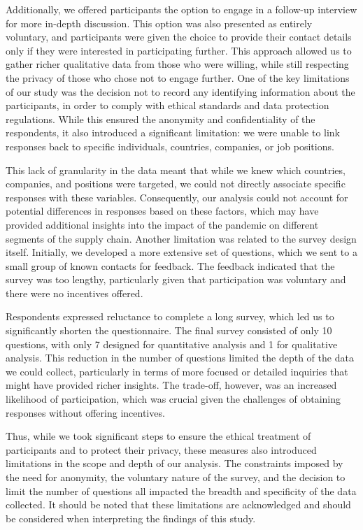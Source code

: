 Additionally, we offered participants the option to engage in a follow-up interview for more in-depth discussion. This option was also presented as entirely voluntary, and participants were given the choice to provide their contact details only if they were interested in participating further. This approach allowed us to gather richer qualitative data from those who were willing, while still respecting the privacy of those who chose not to engage further. One of the key limitations of our study was the decision not to record any identifying information about the participants, in order to comply with ethical standards and data protection regulations. While this ensured the anonymity and confidentiality of the respondents, it also introduced a significant limitation: we were unable to link responses back to specific individuals, countries, companies, or job positions. 

This lack of granularity in the data meant that while we knew which countries, companies, and positions were targeted, we could not directly associate specific responses with these variables. Consequently, our analysis could not account for potential differences in responses based on these factors, which may have provided additional insights into the impact of the pandemic on different segments of the supply chain. Another limitation was related to the survey design itself. Initially, we developed a more extensive set of questions, which we sent to a small group of known contacts for feedback. The feedback indicated that the survey was too lengthy, particularly given that participation was voluntary and there were no incentives offered. 

Respondents expressed reluctance to complete a long survey, which led us to significantly shorten the questionnaire. The final survey consisted of only 10 questions, with only 7 designed for quantitative analysis and 1 for qualitative analysis. This reduction in the number of questions limited the depth of the data we could collect, particularly in terms of more focused or detailed inquiries that might have provided richer insights. The trade-off, however, was an increased likelihood of participation, which was crucial given the challenges of obtaining responses without offering incentives.

Thus, while we took significant steps to ensure the ethical treatment of participants and to protect their privacy, these measures also introduced limitations in the scope and depth of our analysis. The constraints imposed by the need for anonymity, the voluntary nature of the survey, and the decision to limit the number of questions all impacted the breadth and specificity of the data collected. It should be noted that these limitations are acknowledged and should be considered when interpreting the findings of this study.

